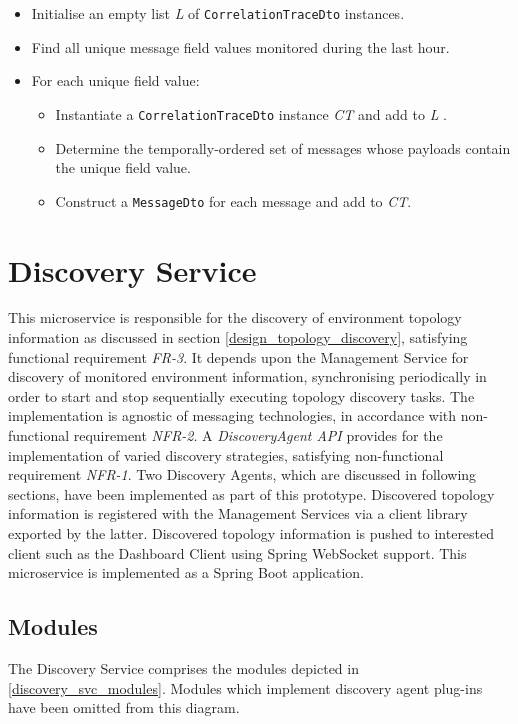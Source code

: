 \begin{itemize}
	\item Initialise an empty list \textit{L} of \texttt{CorrelationTraceDto} instances.
	\item Find all unique message field values monitored during the last hour.
	\item For each unique field value:
	\begin{itemize}
		\item Instantiate a \texttt{CorrelationTraceDto} instance \textit{CT} and add to \textit{L} .
		\item Determine the temporally-ordered set of messages whose payloads contain the unique field value.
		\item Construct a \texttt{MessageDto} for each message and add to \textit{CT}.
	\end{itemize}
\end{itemize}

 \newpage
 
 \section{Discovery Service}
 
This microservice is responsible for the discovery of environment topology information as discussed in section \ref{design_topology_discovery}, satisfying functional requirement \textit{FR-3}. It depends upon the Management Service for discovery of monitored environment information, synchronising periodically in order to start and stop sequentially executing topology discovery tasks. The implementation is agnostic of messaging technologies, in accordance with non-functional requirement \textit{NFR-2}.  A \textit{DiscoveryAgent API} provides for the implementation of varied discovery strategies, satisfying non-functional requirement \textit{NFR-1}. Two Discovery Agents, which are discussed in following sections, have been implemented as part of this prototype. Discovered topology information is registered with the Management Services via a client library exported by the latter. Discovered topology information is pushed to interested client such as the Dashboard Client using Spring WebSocket support.  This microservice is implemented as a Spring Boot application.
 
 \subsection{Modules}
 The Discovery Service comprises the modules depicted in \ref{discovery_svc_modules}. Modules which implement discovery agent plug-ins have been omitted from this diagram.
 
